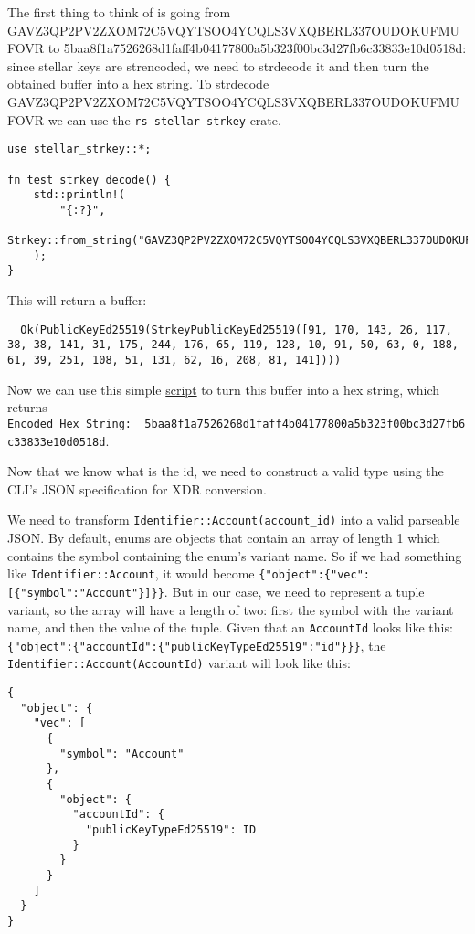 The first thing to think of is going from GAVZ3QP2PV2ZXOM72C5VQYTSOO4YCQLS3VXQBERL337OUDOKUFMUFOVR to 5baa8f1a7526268d1faff4b04177800a5b323f00bc3d27fb6c33833e10d0518d: since stellar keys are strencoded, we need to strdecode it and then turn the obtained buffer into a hex string. To strdecode GAVZ3QP2PV2ZXOM72C5VQYTSOO4YCQLS3VXQBERL337OUDOKUFMUFOVR we can use the \texttt{rs-stellar-strkey} crate.

\begin{lstlisting}
use stellar_strkey::*;

fn test_strkey_decode() {
	std::println!(
        "{:?}",
        Strkey::from_string("GAVZ3QP2PV2ZXOM72C5VQYTSOO4YCQLS3VXQBERL337OUDOKUFMUFOVR")
    );
}
\end{lstlisting}

This will return a buffer:

\begin{lstlisting}
  Ok(PublicKeyEd25519(StrkeyPublicKeyEd25519([91, 170, 143, 26, 117, 38, 38, 141, 31, 175, 244, 176, 65, 119, 128, 10, 91, 50, 63, 0, 188, 61, 39, 251, 108, 51, 131, 62, 16, 208, 81, 141])))
\end{lstlisting}

Now we can use this simple \href{https://go.dev/play/p/z3yJPp72K8B}{script} to turn this buffer into a hex string, which returns \texttt{Encoded\ Hex\ String:\ \ 5baa8f1a7526268d1faff4b04177800a5b323f00bc3d27fb6c33833e10d0518d}.

Now that we know what is the id, we need to construct a valid type using the CLI's JSON specification for XDR conversion.

We need to transform \texttt{Identifier::Account(account\_id)} into a valid parseable JSON. By default, enums are objects that contain an array of length 1 which contains the symbol containing the enum's variant name. So if we had something like \texttt{Identifier::Account}, it would become \texttt{\{"object":\{"vec":{[}\{"symbol":"Account"\}{]}\}\}}. But in our case, we need to represent a tuple variant, so the array will have a length of two: first the symbol with the variant name, and then the value of the tuple. Given that an \texttt{AccountId} looks like this: \texttt{\{"object":\{"accountId":\{"publicKeyTypeEd25519":"id"\}\}\}}, the \texttt{Identifier::Account(AccountId)} variant will look like this:

\begin{lstlisting}
{
  "object": {
    "vec": [
      {
        "symbol": "Account"
      },
      {
        "object": {
          "accountId": {
            "publicKeyTypeEd25519": ID
          }
        }
      }
    ]
  }
}
\end{lstlisting}

